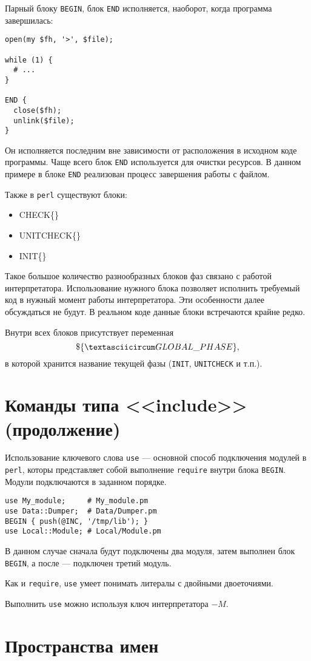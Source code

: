 Парный блоку \verb|BEGIN|, блок \verb|END| исполняется, наоборот, когда программа завершилась:
\begin{verbatim}
open(my $fh, '>', $file);

while (1) {
  # ...
}

END {
  close($fh);
  unlink($file);
}
\end{verbatim}
Он исполняется последним вне зависимости от расположения в исходном коде программы. Чаще всего блок \verb|END| используется для очистки ресурсов. В данном примере в блоке \verb|END| реализован процесс завершения работы с файлом.

Также в \verb|perl| существуют блоки:
\begin{itemize}
	\item CHECK\{\}
	\item UNITCHECK\{\}
	\item INIT\{\}
\end{itemize}
Такое большое количество разнообразных блоков фаз связано с работой интерпретатора. Использование нужного блока позволяет исполнить требуемый код в нужный момент работы интерпретатора. Эти особенности далее обсуждаться не будут. В реальном коде данные блоки встречаются крайне редко.

Внутри всех блоков присутствует переменная
\[ \$\{ \textasciicircum GLOBAL \_ PHASE \}, \]
в которой хранится название текущей фазы (\verb|INIT|, \verb|UNITCHECK| и т.п.).

\section{Команды типа <<include>> (продолжение)} %
Использование ключевого слова \verb|use| --- основной способ подключения модулей в \verb|perl|, которы представляет собой выполнение \verb|require| внутри блока \verb|BEGIN|. Модули подключаются в заданном порядке.
\begin{verbatim}
use My_module;     # My_module.pm
use Data::Dumper;  # Data/Dumper.pm
BEGIN { push(@INC, '/tmp/lib'); }
use Local::Module; # Local/Module.pm
\end{verbatim}
В данном случае сначала будут подключены два модуля, затем выполнен блок \verb|BEGIN|, а после --- подключен третий модуль.

Как и \verb|require|, \verb|use| умеет понимать литералы с двойными двоеточиями.

Выполнить \verb|use| можно используя ключ интерпретатора $-M$.

\section{Пространства имен} %

